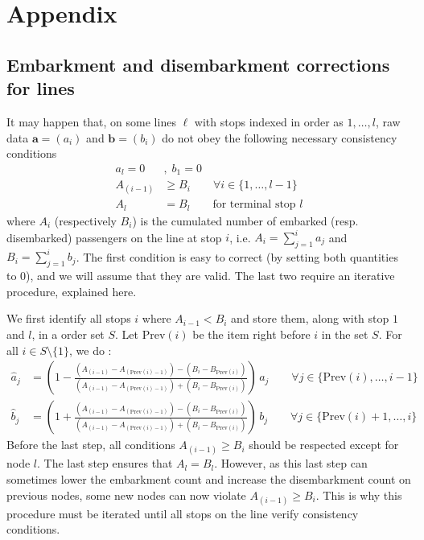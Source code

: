 \documentclass{bmcart}
\begin{document}
\section*{Appendix}

\subsection*{Embarkment and disembarkment corrections for lines}
\label{flow_correction}
It may happen that, on some lines $\ell$ with stops indexed in order as $1, \ldots, l$, raw data $\mathbf{a}=(a_i)$ and $\mathbf{b}=(b_i)$ do not obey the following necessary consistency conditions 
\begin{align*}
	a_l = 0&, \; b_1 = 0 \\
	A_{(i-1)} &\geq B_i \qquad \forall i \in \{1, \ldots, l-1\} \\
	A_{l} &= B_{l} \qquad \text{for terminal stop $l$}
\end{align*}
where $A_i$ (respectively $B_i$) is the cumulated number of embarked (resp. disembarked) passengers on the line at stop $i$, i.e. $A_i = \sum_{j=1}^{i} a_j$ and $B_i = \sum_{j=1}^{i} b_j$. The first condition is easy to correct (by setting both quantities to $0$), and we will assume that they are valid. The last two require an iterative procedure, explained here.

We first identify all stops $i$ where $A_{i - 1} < B_i$ and store them, along with stop $1$ and $l$, in a order set $S$. Let $\text{Prev}(i)$ be the item right before $i$ in the set $S$. For all $i \in S \setminus \{1\}$, we do :
\begin{align*}
		\hat{a}_j&=\left( 1-\frac{(A_{(i-1)} - A_{(\text{Prev}(i)-1)}) - (B_{i} -  B_{\text{Prev}(i)})}{(A_{(i-1)} - A_{(\text{Prev}(i)-1)}) + (B_{i} -  B_{\text{Prev}(i)})}\right)\, a_j  \qquad \forall j \in \{ \text{Prev}(i), \ldots, i-1 \} \\
	\hat{b}_j&=\left( 1+\frac{(A_{(i-1)} - A_{(\text{Prev}(i)-1)}) - (B_{i} -  B_{\text{Prev}(i)})}{(A_{(i-1)} - A_{(\text{Prev}(i)-1)}) + (B_{i} -  B_{\text{Prev}(i)})}\right)\, b_j  \qquad \forall j \in \{ \text{Prev}(i) + 1, \ldots, i \}
\end{align*}
Before the last step, all conditions $A_{(i-1)} \geq  B_{i}$ should be respected except for node $l$. The last step ensures that $A_{l} = B_{l}$. However, as this last step can sometimes lower the embarkment count and increase the disembarkment count on previous nodes, some new nodes can now violate $A_{(i-1)} \geq B_i$. This is why this procedure must be iterated until all stops on the line verify consistency conditions. 
\end{document}
